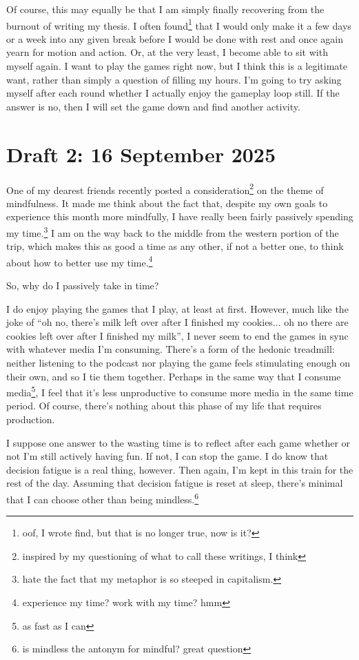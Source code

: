\documentclass[12pt]{article}
\newcommand{\say}[1]{``#1''}
\renewcommand{\,}{\textsuperscript{,}}
\begin{document}
Of course, this may equally be that I am simply finally recovering from the burnout of writing my thesis.
I often found\footnote{oof, I wrote find, but that is no longer true, now is it?} that I would only make it a few days or a week into any given break before I would be done with rest and once again yearn for motion and action.
Or, at the very least, I become able to sit with myself again.
I want to play the games right now, but I think this is a legitimate want, rather than simply a question of filling my hours.
I'm going to try asking myself after each round whether I actually enjoy the gameplay loop still.
If the answer is no, then I will set the game down and find another activity.

\section{Draft 2: 16 September 2025}
One of my dearest friends recently posted a consideration\footnote{inspired by my questioning of what to call these writings, I think} on the theme of mindfulness.
It made me think about the fact that, despite my own goals to experience this month more mindfully, I have really been fairly passively spending my time.\footnote{hate the fact that my metaphor is so steeped in capitalism.}
I am on the way back to the middle from the western portion of the trip, which makes this as good a time as any other, if not a better one, to think about how to better use my time.\footnote{experience my time? work with my time? hmm}

So, why do I passively take in time?

I do enjoy playing the games that I play, at least at first.
However, much like the joke of \say{oh no, there's milk left over after I finished my cookies... oh no there are cookies left over after I finished my milk}, I never seem to end the games in sync with whatever media I'm consuming.
There's a form of the hedonic treadmill: neither listening to the podcast nor playing the game feels stimulating enough on their own, and so I tie them together.
Perhaps in the same way that I consume media\footnote{as fast as I can}, I feel that it's less unproductive to consume more media in the same time period.
Of course, there's nothing about this phase of my life that requires production.

I suppose one answer to the wasting time is to reflect after each game whether or not I'm still actively having fun.
If not, I can stop the game.
I do know that decision fatigue is a real thing, however.
Then again, I'm kept in this train for the rest of the day.
Assuming that decision fatigue is reset at sleep, there's minimal that I can choose other than being mindless.\footnote{is mindless the antonym for mindful? great question}
\end{document}
